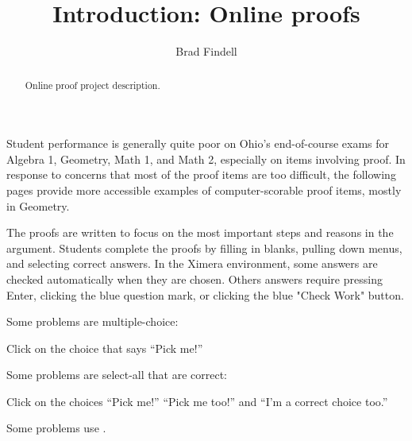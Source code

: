\documentclass[nooutcomes]{ximera}
\title{Introduction: Online proofs}
\author{Brad Findell}
\begin{document}
\begin{abstract}
Online proof project description. 
\end{abstract}
\maketitle

Student performance is generally quite poor on Ohio's end-of-course exams for Algebra 1, Geometry, Math 1, and Math 2, especially on items involving proof.  In response to concerns that most of the proof items are too difficult, the following pages provide more accessible examples of computer-scorable proof items, mostly in Geometry.

The proofs are written to focus on the most important steps and reasons in the argument.  Students complete the proofs by filling in blanks, pulling down menus, and selecting correct answers.  In the Ximera environment, some answers are checked automatically when they are chosen.  Others answers require pressing Enter, clicking the blue question mark, or clicking the blue "Check Work" button. 

\begin{example}
  Some problems are multiple-choice:
  \begin{multipleChoice}
  \end{multipleChoice}
  \begin{feedback}
    Click on the choice that says ``Pick me!''
  \end{feedback}
\end{example}


\begin{example}
  Some problems are select-all that are correct:
  \begin{selectAll}
  \end{selectAll}
  \begin{feedback}
    Click on the choices ``Pick me!'' ``Pick me too!'' and ``I'm a correct choice too.''
  \end{feedback}
\end{example}

\begin{example}
  Some problems use .
\end{example}
\end{document}
